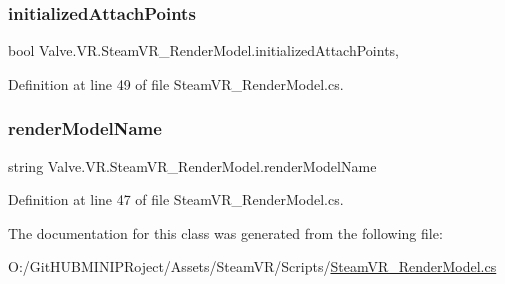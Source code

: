\subsubsection{\texorpdfstring{initializedAttachPoints}{initializedAttachPoints}}
{\footnotesize\ttfamily bool Valve.\+V\+R.\+Steam\+V\+R\+\_\+\+Render\+Model.\+initialized\+Attach\+Points\hspace{0.3cm}{\ttfamily [get]}, {\ttfamily [set]}}



Definition at line 49 of file Steam\+V\+R\+\_\+\+Render\+Model.\+cs.

\mbox{\label{class_valve_1_1_v_r_1_1_steam_v_r___render_model_a0655bfb7f8ed5cfb849c2156737dab6a}} 
\subsubsection{\texorpdfstring{renderModelName}{renderModelName}}
{\footnotesize\ttfamily string Valve.\+V\+R.\+Steam\+V\+R\+\_\+\+Render\+Model.\+render\+Model\+Name\hspace{0.3cm}{\ttfamily [get]}}



Definition at line 47 of file Steam\+V\+R\+\_\+\+Render\+Model.\+cs.



The documentation for this class was generated from the following file\+:\begin{DoxyCompactItemize}
\item 
O\+:/\+Git\+H\+U\+B\+M\+I\+N\+I\+P\+Roject/\+Assets/\+Steam\+V\+R/\+Scripts/\mbox{\hyperlink{_steam_v_r___render_model_8cs}{Steam\+V\+R\+\_\+\+Render\+Model.\+cs}}\end{DoxyCompactItemize}

